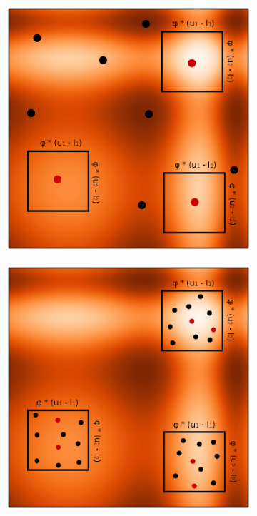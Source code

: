 \begin{figure}[tp]
\centering
\begin{subfigure}{.5\textwidth}
  \centering
  \includegraphics[width=1.1\linewidth]{fig_2.eps}
  \caption{}
  \label{fig:SpaceReduction-a}
\end{subfigure}%
\begin{subfigure}{.5\textwidth}
  \centering
  \includegraphics[width=1.1\linewidth]{fig_3.eps}

\end{subfigure}
\end{figure}
